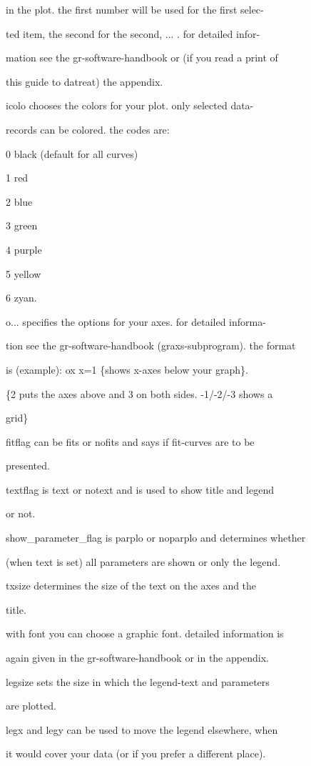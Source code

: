\documentclass[]{article}
\begin{document}
in the plot. the first number will be used for the first selec-

ted item, the second for the second, ... . for detailed infor-

mation see the gr-software-handbook or (if you read a print of

this guide to datreat) the appendix.

icolo chooses the colors for your plot. only selected data-

records can be colored. the codes are:

0 black (default for all curves)

1 red

2 blue

3 green

4 purple

5 yellow

6 zyan.

o... specifies the options for your axes. for detailed informa-

tion see the gr-software-handbook (graxs-subprogram). the format

is (example): ox x=1 \{shows x-axes below your graph\}.

\{2 puts the axes above and 3 on both sides. -1/-2/-3 shows a

grid\}

fitflag can be fits or nofits and says if fit-curves are to be

presented.

textflag is text or notext and is used to show title and legend

or not.

show\_parameter\_flag is parplo or noparplo and determines whether

(when text is set) all parameters are shown or only the legend.

txsize determines the size of the text on the axes and the

title.

with font you can choose a graphic font. detailed information is

again given in the gr-software-handbook or in the appendix.

legsize sets the size in which the legend-text and parameters

are plotted.

legx and legy can be used to move the legend elsewhere, when

it would cover your data (or if you prefer a different place).
\end{document}
